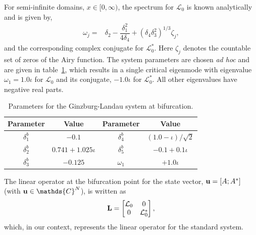 For semi-infinite domains, $x\in[0,\infty)$, the spectrum for $\mathcal{L}_{0}$ is known analytically \citep{chomaz88} and is given by,
	\begin{align}
		\omega_{j}	=& \delta_{2} - \dfrac{\delta_{1}^{2}}{4\delta_{4}} + (\delta_{4}\delta_{3}^{2})^{1/3}\zeta_{j}, \label{eqn:eigenvalues} 
	\end{align}
and the corresponding complex conjugate for $\mathcal{L}^{*}_{0}$. Here $\zeta_{j}$ denotes the countable set of zeros of the Airy function. The system parameters are chosen \emph{ad hoc} and are given in table~\ref{table:GL_bifurcation_params}, which results in a single critical eigenmode with eigenvalue $\omega_{1} = 1.0\iota$ for $\mathcal{L}_{0}$ and its conjugate, $-1.0\iota$ for $\mathcal{L}^{*}_{0}$. All other eigenvalues have negative real parts. 
\begin{table}[h]
	\renewcommand{\arraystretch}{1.5}
	\begin{tabular}{cc|cc}
			Parameter & Value & Parameter & Value \\
			\hline
			\hline
			$\delta^{b}_{1}$ & $-0.1$  & $\delta^{b}_{4}$ & $(1.0 - \iota)/\sqrt{2}$ \\
			\hline
			 $\delta^{b}_{2}$ & $0.741 + 1.025\iota$ & $\delta^{b}_{5}$ & $-0.1+0.1\iota$ \\
			 \hline
			$\delta^{b}_{3}$ & $-0.125$ &  $\omega_{1}$ & $+1.0\iota$ \\
			\hline	
			\hline
		\end{tabular}
		\caption{Parameters for the Ginzburg-Landau system at bifurcation.}
		\label{table:GL_bifurcation_params} 
\end{table}
 The linear operator at the bifurcation point for the state vector, $\mathbf{u} = [A; A^{*}]$ (with $\vecu\in\mathds{C}^{N}$), is written as
\begin{eqnarray}
	\mathbf{L} = \begin{bmatrix}
		\mathcal{L}_{0}		& 0 \\
		0								  & \mathcal{L}^{*}_{0}
	\end{bmatrix},
\end{eqnarray}
which, in our context, represents the linear operator for the standard system. 
 
